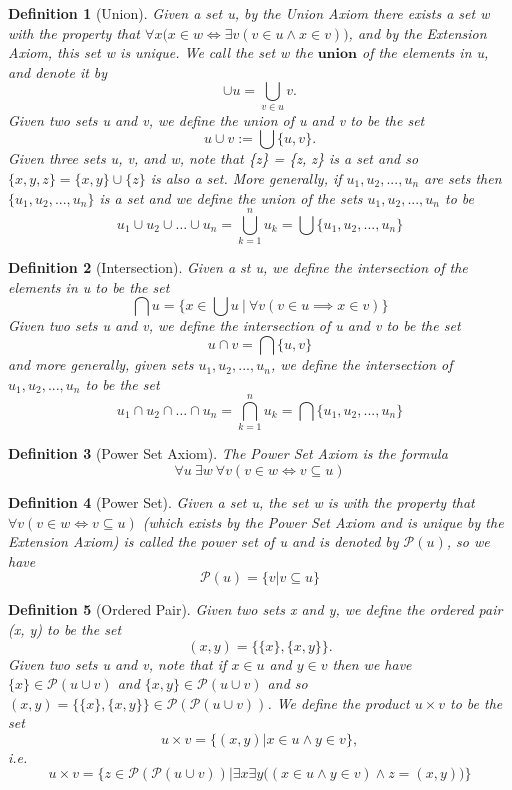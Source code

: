\documentclass[11pt, oneside]{book}
\theoremstyle{break}
\newtheorem{defn}{Definition}[section]
\begin{document}
\begin{defn}[Union]
	Given a set u, by the Union Axiom there exists a set w with the property that $\forall x \Big( x \in w \iff \exists v (v \in u \land x \in v) \Big)$, and by the Extension Axiom, this set w is unique. We call the set w the $\textbf{union}$ of the elements in u, and denote it by
	\[
		\cup u = \bigcup_{v \in u} v.
	\]Given two sets u and v, we define the union of u and v to be the set
	\[
		u \cup v := \bigcup \{u, v\}.
	\]
	Given three sets u, v, and w, note that \{z\} = \{z, z\} is a set and so $\{x, y, z\} = \{x, y\} \cup \{z\}$ is also a set. More generally, if $u_1, u_2, ..., u_n$ are sets then $\{u_1, u_2, ..., u_n\}$ is a set and we define the union of the sets $u_1, u_2, ..., u_n$ to be
	\[
		u_1 \cup u_2 \cup \hdots \cup u_n = \bigcup_{k = 1}^{n} u_k = \bigcup \{u_1, u_2, ..., u_n\}
	\]
\end{defn}

\begin{defn}[Intersection]
	Given a st u, we define the intersection of the elements in u to be the set
	\[
		\bigcap u = \biggl\{ x \in \bigcup u \> \Big| \> \forall v (v \in u \implies x \in v) \biggr\}
	\] Given two sets u and v, we define the intersection of u and v to be the set
	\[
		u \cap v = \bigcap \{u, v\}
	\] and more generally, given sets $u_1, u_2, ..., u_n$, we define the intersection of $u_1, u_2, ..., u_n$ to be the set
	\[
	 	u_1 \cap u_2 \cap \hdots \cap u_n = \bigcap_{k=1}^{n} u_k = \bigcap \{u_1, u_2, ..., u_n\}
	\] 
\end{defn}

\begin{defn}[Power Set Axiom]
	The Power Set Axiom is the formula
	\[
		\forall u \> \exists w \> \forall v (v \in w \iff v \subseteq u)
	\]
\end{defn}

\begin{defn}[Power Set]
	Given a set u, the set w is with the property that $\forall v (v \in w \iff v \subseteq u)$ (which exists by the Power Set Axiom and is unique by the Extension Axiom) is called the power set of u and is denoted by $\mathcal{P}(u)$, so we have
	\[
		\mathcal{P}(u) = \{v | v \subseteq u\}
	\]
\end{defn}

\begin{defn}[Ordered Pair]
	Given two sets x and y, we define the ordered pair (x, y) to be the set
	\[
		(x, y) = \{\{x\}, \{x, y\}\}.
	\]
	Given two sets u and v, note that if $x \in u$ and $y \in v$ then we have $\{x\} \in \mathcal{P}(u \cup v)$ and $\{x, y\} \in \mathcal{P}(u \cup v)$ and so $(x, y) = \{\{x\}, \{x, y\}\} \in \mathcal{P}(\mathcal{P}(u \cup v))$. We define the product $u \times v$ to be the set
	\[
		u \times v = \{(x, y) | x \in u \land y \in v\},
	\] i.e.
	\[
		u \times v = \Bigr\{ z \in \mathcal{P}(\mathcal{P}(u \cup v)) | \exists x \exists y \big( (x \in u \land y \in v) \land z = (x, y) \big) \Bigr\}
	\]
\end{defn}
\end{document}
